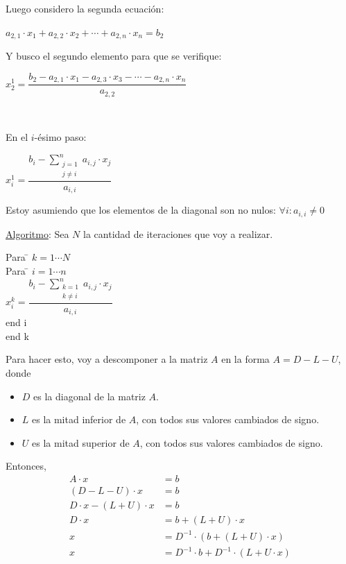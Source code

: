 \documentclass[]{article}
\begin{document}
Luego considero la segunda ecuación:
\begin{center}
	$a_{2,1}\cdot x_1 + a_{2,2}\cdot x_2 + \cdots + a_{2,n}\cdot x_n = b_2$
\end{center}

Y busco el segundo elemento para que se verifique:
\begin{center}
	$x_2^1 = \dfrac{b_2 - a_{2,1}\cdot x_1 - a_{2,3}\cdot x_3 - \cdots - a_{2,n}\cdot x_n}{a_{2,2}}$
\end{center}

~\newline

En el $i$-ésimo paso:
\begin{center}
	$x_i^1 = \dfrac{\displaystyle b_i - \sum_{\substack{j=1 \\ j\neq i}}^{n}{a_{i,j}\cdot x_j}}{a_{i,i}}$
\end{center}

\begin{obs}
	Estoy asumiendo que los elementos de la diagonal son no nulos: $\forall i : a_{i,i} \neq 0$
\end{obs}

\underline{Algoritmo}:
Sea $N$ la cantidad de iteraciones que voy a realizar.
\begin{tabbing}
Para \= $k=1\cdots N$\\
\> Para \= $i=1\cdots n$\\
\> \> $x_i^k = \dfrac{\displaystyle b_i - \sum_{\substack{k=1 \\ k\neq i}}^{n}{a_{i,j}\cdot x_j}}{a_{i,i}}$\\
\> end i\\
end k\\
\end{tabbing}


Para hacer esto, voy a descomponer a la matriz $A$ en la forma $A= D-L-U$, donde
\begin{itemize}
	\item $D$ es la diagonal de la matriz $A$.
	\item $L$ es la mitad inferior de $A$, con todos sus valores cambiados de signo.
	\item $U$ es la mitad superior de $A$, con todos sus valores cambiados de signo.
\end{itemize}

Entonces,
\begin{align*}
	A\cdot x &= b\\
	(D-L-U)\cdot x &= b\\
	D\cdot x - (L+U)\cdot x &= b\\
	D\cdot x &= b + (L+U)\cdot x\\
	x &= D^{-1}\cdot (b + (L+U)\cdot x)\\
	x&= D^{-1}\cdot b + D^{-1}\cdot (L+U \cdot x)\\
\end{align*}
\end{document}
